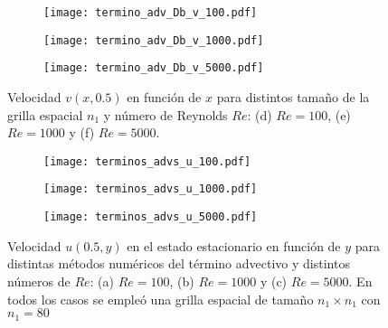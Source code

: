\documentclass[aps,prb,twocolumn,superscriptaddress,floatfix,longbibliography,10pt]{revtex4-2}
\newcounter{para}
\begin{document}
\begin{figure}
  \centering
  
  \begin{subfigure}[b]{0.32\textwidth}
    \centering
    \texttt{[image: termino\_adv\_Db\_v\_100.pdf]}
    \caption{}
    \label{fig:termino_adv_Db_v_100}
\end{subfigure}
\hfill
\begin{subfigure}[b]{0.32\textwidth}
    \centering
    \texttt{[image: termino\_adv\_Db\_v\_1000.pdf]}
    \caption{}
    \label{fig:termino_adv_Db_v_1000}
\end{subfigure}
\hfill
\begin{subfigure}[b]{0.32\textwidth}
    \centering
    \texttt{[image: termino\_adv\_Db\_v\_5000.pdf]}
    \caption{}
    \label{fig:termino_adv_Db_v_5000}
\end{subfigure}
     \caption{Velocidad $v(x,0.5)$ en función de $x$ para distintos tamaño de la grilla espacial $n_1$ y número de Reynolds $Re$: (d) $Re = 100$, (e) $Re = 1000$ y (f) $Re = 5000$.}
     \label{fig:velocidades_v_DC2_vs_Re}
\end{figure}





\begin{figure}
  \centering
  \begin{subfigure}[b]{0.32\textwidth}
      \centering
      \texttt{[image: terminos\_advs\_u\_100.pdf]}
      \caption{}
      \label{fig:terminos_advs_u_100}
  \end{subfigure}
  \hfill
  \begin{subfigure}[b]{0.32\textwidth}
      \centering
      \texttt{[image: terminos\_advs\_u\_1000.pdf]}
      \caption{}
      \label{fig:terminos_advs_u_1000}
  \end{subfigure}
  \hfill
  \begin{subfigure}[b]{0.32\textwidth}
      \centering
      \texttt{[image: terminos\_advs\_u\_5000.pdf]}
      \caption{}
      \label{fig:terminos_advs_u_5000}
  \end{subfigure}
     \caption{Velocidad $u(0.5,y)$ en el estado estacionario en función de $y$ para distintas métodos numéricos del término advectivo y distintos números de $Re$: (a) $Re = 100$, (b) $Re = 1000$ y (c) $Re = 5000$. En todos los casos se empleó una grilla espacial de tamaño $n_1 \times n_1$ con $n_1 = 80$}
     \label{fig:terminos_advs_u}
\end{figure}
\end{document}
